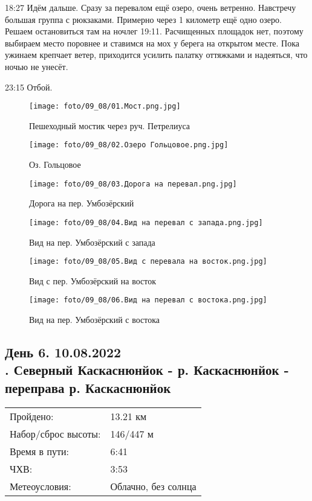 18:27 Идём дальше. Сразу за перевалом ещё озеро, очень ветренно. Навстречу большая группа с рюкзаками.
Примерно через 1 километр ещё одно озеро. Решаем остановиться там на ночлег 19:11.
Расчищенных площадок нет, поэтому выбираем место поровнее и ставимся на мох у берега на открытом месте.
Пока ужинаем крепчает ветер, приходится усилить палатку оттяжками и надеяться, что ночью не унесёт.

23:15 Отбой.

\begin{figure}
    \centering
    \texttt{[image: foto/09\_08/01.Мост.png.jpg]}
    \caption{Пешеходный мостик через руч. Петрелиуса}
\end{figure}

\begin{figure}
    \centering
    \texttt{[image: foto/09\_08/02.Озеро Гольцовое.png.jpg]}
    \caption{Оз. Гольцовое}
\end{figure}

\begin{figure}
    \centering
    \texttt{[image: foto/09\_08/03.Дорога на перевал.png.jpg]}
    \caption{Дорога на пер. Умбозёрский}
\end{figure}

\begin{figure}
    \centering
    \texttt{[image: foto/09\_08/04.Вид на перевал с запада.png.jpg]}
    \caption{Вид на пер. Умбозёрский с запада}
\end{figure}

\begin{figure}
    \centering
    \texttt{[image: foto/09\_08/05.Вид с перевала на восток.png.jpg]}
    \caption{Вид с пер. Умбозёрский на восток}
\end{figure}

\begin{figure}[H]
    \centering
    \texttt{[image: foto/09\_08/06.Вид на перевал с востока.png.jpg]}
    \caption{Вид на пер. Умбозёрский с востока}
\end{figure}

\subsection{День 6. 10.08.2022\\
. Северный Каскаснюнйок - р. Каскаснюнйок - переправа р. Каскаснюнйок}
\begin{tabular}{l p{12cm}}
\hline
Пройдено: & 13.21 км\\
Набор/сброс высоты: & 146/447 м\\
Время в пути: & 6:41\\
ЧХВ: & 3:53\\
Метеоусловия: & Облачно, без солнца\\
\hline
\end{tabular}

